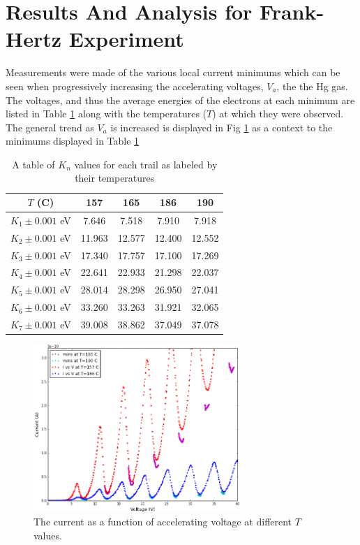 \documentclass[prb,preprint]{revtex4-1}
\begin{document}
\section{Results And Analysis for Frank-Hertz Experiment}

Measurements were made of the various local current minimums which can be seen when progressively increasing the accelerating voltages, $V_a$, the the Hg gas. The voltages, and thus the average energies of the electrons at each minimum are listed in Table \ref{energies} along with the temperatures ($T$) at which they were observed. The general trend as $V_a$ is increased is displayed in Fig \ref{large} as a context to the minimums displayed in Table \ref{energies}

\begin{table}[h]
\caption{A table of $K_n$ values for each trail as labeled by their temperatures}
\begin{ruledtabular}
\begin{tabular}{c c c c c}
$T$ (C) & 157 & 165 & 186 & 190\\
\hline
$K_1\pm0.001$ eV & 7.646   & 7.518   & 7.910   & 7.918\\
$K_2\pm0.001$ eV & 11.963 & 12.577 & 12.400 & 12.552\\
$K_3\pm0.001$ eV & 17.340 & 17.757 & 17.100 & 17.269\\
$K_4\pm0.001$ eV & 22.641 & 22.933 & 21.298 & 22.037\\
$K_5\pm0.001$ eV & 28.014 & 28.298 & 26.950 & 27.041\\
$K_6\pm0.001$ eV & 33.260 & 33.263 & 31.921 & 32.065\\
$K_7\pm0.001$ eV & 39.008 & 38.862 & 37.049 & 37.078\\
\end{tabular}
\end{ruledtabular}
\label{energies}
\end{table}

\begin{figure}[h]
\centering
\includegraphics[width=0.7\textwidth]{large.png}
\caption{The current as a function of accelerating voltage at different $T$ values.}
\label{large}
\end{figure}
\end{document}
